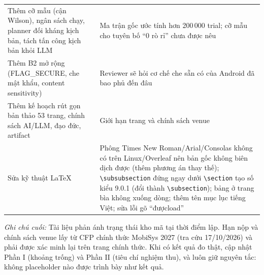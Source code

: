 \documentclass[11pt,a4paper]{article}
\newcommand{\code}[1]{\texttt{\small #1}}
\begin{document}
\begin{longtable}{@{}p{4.6cm}p{10.2cm}@{}}
Thêm cỡ mẫu (cận Wilson), ngân sách chạy, planner đối kháng kịch bản, tách tấn công kịch bản khỏi LLM & Ma trận gốc ước tính hơn 200\,000 trial; cỡ mẫu cho tuyên bố ``0 rò rỉ'' chưa được nêu \\
Thêm B2 mở rộng (FLAG\_SECURE, che mật khẩu, content sensitivity) & Reviewer sẽ hỏi cơ chế che sẵn có của Android đã bao phủ đến đâu \\
Thêm kế hoạch rút gọn bản thảo 53 trang, chính sách AI/LLM, đạo đức, artifact & Giới hạn trang và chính sách venue \\
Sửa kỹ thuật LaTeX & Phông Times New Roman/Arial/Consolas không có trên Linux/Overleaf nên bản gốc không biên dịch được (thêm phương án thay thế); \code{\textbackslash subsubsection} đứng ngay dưới \code{\textbackslash section} tạo số kiểu 9.0.1 (đổi thành \code{\textbackslash subsection}); bảng ở trang bìa không xuống dòng; thêm tên mục lục tiếng Việt; sửa lỗi gõ ``đượcload'' \\
\bottomrule
\end{longtable}

\vspace{1em}
\noindent\emph{Ghi chú cuối:} Tài liệu phản ánh trạng thái kho mã tại thời điểm lập. Hạn nộp và chính sách venue lấy từ CFP chính thức MobiSys 2027 (tra cứu 17/10/2026) và phải được xác minh lại trên trang chính thức. Khi có kết quả đo thật, cập nhật Phần I (khoảng trống) và Phần II (tiêu chí nghiệm thu), và luôn giữ nguyên tắc: không
placeholder nào được trình bày như kết quả.
\end{document}
